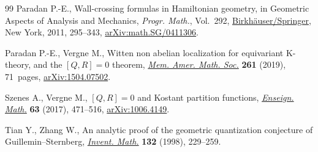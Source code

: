 \documentclass[11pt]{article}
\numberwithin{equation}{section}
\begin{document}
\begin{thebibliography}{99}
Paradan P.-E., Wall-crossing formulas in {H}amiltonian geometry, in Geometric
 Aspects of Analysis and Mechanics, \textit{Progr. Math.}, Vol.~292,
 \href{https://doi.org/10.1007/978-0-8176-8244-6_11}{Birkh\"{a}user/Springer}, New York, 2011, 295--343, \href{https://arxiv.org/abs/math.SG/0411306}{arXiv:math.SG/0411306}.

Paradan P.-E., Vergne M., Witten non abelian localization for equivariant
 {K}-theory, and the {$[Q,R]=0$} theorem, \href{https://doi.org/10.1090/memo/1257}{\textit{Mem. Amer. Math. Soc.}}
 \textbf{261} (2019), 71~pages, \href{https://arxiv.org/abs/1504.07502}{arXiv:1504.07502}.

Szenes A., Vergne M., {$[Q,R]=0$} and {K}ostant partition functions,
 \href{https://doi.org/10.4171/LEM/63-3/4-8}{\textit{Enseign. Math.}} \textbf{63} (2017), 471--516, \href{https://arxiv.org/abs/1006.4149}{arXiv:1006.4149}.

Tian Y., Zhang W., An analytic proof of the geometric quantization conjecture
 of {G}uillemin--{S}ternberg, \href{https://doi.org/10.1007/s002220050223}{\textit{Invent. Math.}} \textbf{132} (1998),
 229--259.

\end{thebibliography}
\end{document}
